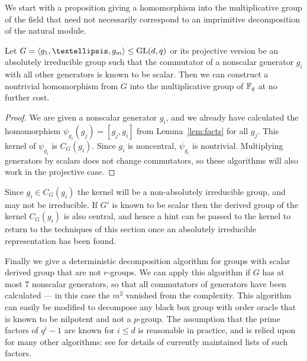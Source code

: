 We start with a proposition giving a homomorphism 
into the multiplicative group of the field that need 
not necessarily correspond to an imprimitive 
decomposition of the natural module.

\begin{Prop}  \label{prop:scal_reduct}
Let $G = \langle g_1, \ldots, g_m \rangle \leq \GL(d, q)$ or 
its projective version
be an absolutely irreducible group such that the commutator 
of a nonscalar generator $g_i$ with all other generators 
is known to be scalar. Then 
we can construct a nontrivial homomorphism from $G$ 
into the multiplicative group of\/ $\mathbb{F}_q$ at no further cost.
\end{Prop}

\begin{proof}
We are given a nonscalar generator $g_i$, 
and we already have calculated the homomorphism $\psi_{g_i}(g_j) = [g_j, g_i]$ from Lemma~\ref{lem:facts} 
for all  $g_j$. 
This
kernel of $\psi_{g_i}$ is $C_G(g_i)$. Since $g_i$ is noncentral, $\psi_{g_i}$ 
is nontrivial.
Multiplying generators by scalars does not 
change commutators, 
so these algorithms will also work in the projective case.  %
\end{proof}



Since $g_i \in C_G(g_i)$ the kernel will 
be a non-absolutely irreducible group, and may not be irreducible. 
If $G'$ is known to be scalar then
 the derived group of the kernel $C_G(g_i)$ is also
central, and hence a hint can be passed to the kernel to return 
to the techniques of this section once an absolutely irreducible 
representation has been found.



Finally we give a deterministic decomposition algorithm 
for groups with scalar derived group that are not $r$-groups. 
We can apply this algorithm if $G$ has 
at most $7$ nonscalar generators, so that all commutators of generators 
have been calculated --- in this case the $m^2$ vanished
from the complexity. 
This algorithm can easily be modified to decompose any 
black box group with order oracle that is known to be 
nilpotent and not a $p$-group. 
The assumption that the prime factors of $q^i-1$ 
are known for $i \leq d$ is reasonable in practice, 
and is relied upon for many other algorithms: see 
\cite{brillart} for details of currently maintained lists of such factors.


